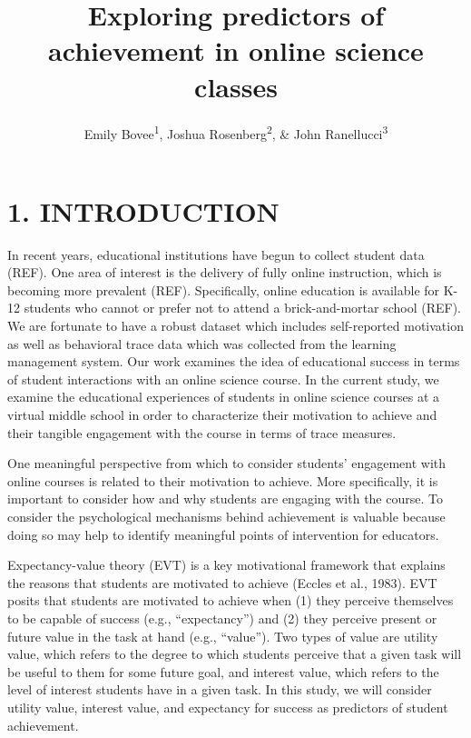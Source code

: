 \documentclass[acmart]{apa6}
\title{Exploring predictors of achievement in online science classes}
\author{Emily Bovee\textsuperscript{1}, Joshua Rosenberg\textsuperscript{2}, \& John Ranellucci\textsuperscript{3}}
\affiliation{
    \vspace{0.5cm}
          \textsuperscript{1} Michigan State University\\
          \textsuperscript{2} University of Tennessee, Knoxville\\
          \textsuperscript{3} Hunter College  }
\theoremstyle{definition}
\theoremstyle{definition}
\theoremstyle{definition}
\theoremstyle{remark}
\begin{document}
\maketitle

\setcounter{secnumdepth}{0}



\section{1. INTRODUCTION}\label{introduction}

In recent years, educational institutions have begun to collect student
data (REF). One area of interest is the delivery of fully online
instruction, which is becoming more prevalent (REF). Specifically,
online education is available for K-12 students who cannot or prefer not
to attend a brick-and-mortar school (REF). We are fortunate to have a
robust dataset which includes self-reported motivation as well as
behavioral trace data which was collected from the learning management
system. Our work examines the idea of educational success in terms of
student interactions with an online science course. In the current
study, we examine the educational experiences of students in online
science courses at a virtual middle school in order to characterize
their motivation to achieve and their tangible engagement with the
course in terms of trace measures.

One meaningful perspective from which to consider students' engagement
with online courses is related to their motivation to achieve. More
specifically, it is important to consider how and why students are
engaging with the course. To consider the psychological mechanisms
behind achievement is valuable because doing so may help to identify
meaningful points of intervention for educators.

Expectancy-value theory (EVT) is a key motivational framework that
explains the reasons that students are motivated to achieve (Eccles et
al., 1983). EVT posits that students are motivated to achieve when (1)
they perceive themselves to be capable of success (e.g.,
\enquote{expectancy}) and (2) they perceive present or future value in
the task at hand (e.g., \enquote{value}). Two types of value are utility
value, which refers to the degree to which students perceive that a
given task will be useful to them for some future goal, and interest
value, which refers to the level of interest students have in a given
task. In this study, we will consider utility value, interest value, and
expectancy for success as predictors of student achievement.
\end{document}
